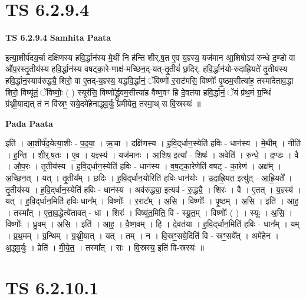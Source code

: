 \documentclass[17pt]{extarticle}
\begin{document}
\section*{ TS 6.2.9.4 }

\textbf{TS 6.2.9.4 } \newline
\textbf{Samhita Paata} \newline

इत्या॒शीर्प॑दय॒र्चा दक्षि॑णस्य हवि॒र्द्धान॑स्य मे॒थीं नि ह॑न्ति शीर्.ष॒त ए॒व य॒ज्ञ्स्य॒ यज॑मान आ॒शिषोऽव॑ रुन्धे द॒ण्डो वा औ॑प॒रस्तृ॒तीय॑स्य हवि॒र्द्धान॑स्य वषट्का॒रे-णाक्ष॑-मच्छिन॒द्-यत्-तृ॒तीयं॑ छ॒दिर्. ह॑वि॒र्द्धान॑यो-रुदाह्रि॒यते॑ तृ॒तीय॑स्य हवि॒र्द्धान॒स्याव॑रुद्ध्यै॒ शिरो॒ वा ए॒तद्-य॒ज्ञ्स्य॒ यद्ध॑वि॒र्द्धानं॒ ॅविष्णो॑ र॒राट॑मसि॒ विष्णोः᳚ पृ॒ष्ठम॒सीत्या॑ह॒ तस्मा॑देताव॒द्धा शिरो॒ विष्यू॑तं॒ ॅविष्णोः॒ ( ) स्यूर॑सि॒ विष्णो᳚र्द्ध्रु॒वम॒सीत्या॑ह वैष्ण॒वꣳ हि दे॒वत॑या हवि॒र्द्धानं॒ ॅयं प्र॑थ॒मं ग्र॒न्थिं ग्र॑थ्नी॒याद्यत् तं न वि॑स्रꣳ॒॒ सये॒दमे॑हेनाद्ध्व॒र्युः प्रमी॑येत॒ तस्मा॒थ् स वि॒स्रस्यः॑ ॥ \newline

\textbf{Pada Paata} \newline

इति॑ । आ॒शीर्प॑द॒येत्या॒शीः - प॒द॒या॒ । ऋ॒चा । दक्षि॑णस्य । ह॒वि॒द्‌र्धान॒स्येति॑ हविः - धान॑स्य । मे॒थीम् । नीति॑ । ह॒न्ति॒ । शी॒र्॒.ष॒तः । ए॒व । य॒ज्ञ्स्य॑ । यज॑मानः । आ॒शिष॒ इत्या᳚ - शिषः॑ । अवेति॑ । रु॒न्धे॒ । द॒ण्डः । वै । औ॒प॒रः । तृ॒तीय॑स्य । ह॒वि॒द्‌र्धान॒स्येति॑ हविः - धान॑स्य । व॒ष॒ट्का॒रेणेति॑ वषट् - का॒रेण॑ । अक्ष᳚म् । अ॒च्छि॒न॒त् । यत् । तृ॒तीय᳚म् । छ॒दिः । ह॒वि॒द्‌र्धान॒योरिति॑ हविः-धान॑योः । उ॒दा॒ह्रि॒यत॒ इत्यु॑त् - आ॒ह्रि॒यते᳚ । तृ॒तीय॑स्य । ह॒वि॒द्‌र्धान॒स्येति॑ हविः - धान॑स्य । अव॑रुद्ध्या॒ इत्यव॑ - रु॒द्ध्यै॒ । शिरः॑ । वै । ए॒तत् । य॒ज्ञ्स्य॑ । यत् । ह॒वि॒द्‌र्धान॒मिति॑ हविः-धान᳚म् । विष्णोः᳚ । र॒राट᳚म् । अ॒सि॒ । विष्णोः᳚ । पृ॒ष्ठम् । अ॒सि॒ । इति॑ । आ॒ह॒ । तस्मा᳚त् । ए॒ता॒व॒द्धेत्ये॑तावत् - धा । शिरः॑ । विष्यू॑त॒मिति॒ वि - स्यू॒त॒म् । विष्णोः᳚ ( ) । स्यूः । अ॒सि॒ । विष्णोः᳚ । ध्रु॒वम् । अ॒सि॒ । इति॑ । आ॒ह॒ । वै॒ष्ण॒वम् । हि । दे॒वत॑या । ह॒वि॒द्‌र्धान॒मिति॑ हविः - धान᳚म् । यम् । प्र॒थ॒मम् । ग्र॒न्थिम् । ग्र॒थ्नी॒यात् । यत् । तम् । न । वि॒स्रꣳ॒॒सये॒दिति॑ वि - स्रꣳ॒॒सये᳚त् । अमे॑हेन । अ॒द्ध्व॒र्युः । प्रेति॑ । मी॒ये॒त॒ । तस्मा᳚त् । सः । वि॒स्रस्य॒ इति॑ वि-स्रस्यः॑ ॥  \newline




\section*{ TS 6.2.10.1 }
\end{document}
